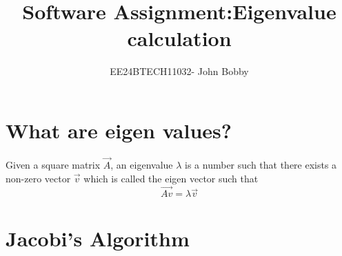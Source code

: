\documentclass[journal,12pt,onecolumn]{IEEEtran}
\theoremstyle{remark}
\begin{document}

\vspace{3cm}

\title{\textbf{Software Assignment:Eigenvalue calculation}}
\author{EE24BTECH11032- John Bobby}
\maketitle
\bigskip

\renewcommand{\thefigure}{\theenumi}
\renewcommand{\thetable}{\theenumi}
\setlength{\columnsep}{2.5em}
\section{What are eigen values?}
Given a square matrix $\vec{A}$, an eigenvalue $\lambda$ is a number such that there exists a non-zero vector $\vec{v}$ which is called the eigen vector such that \\
$$\vec{Av}=\lambda\vec{v}$$
\section{Jacobi's Algorithm}
\end{document}
